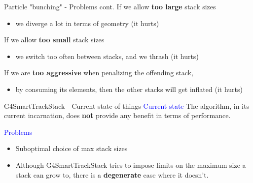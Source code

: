 \documentclass{beamer}
\begin{document}
\begin{frame}{Particle "bunching" - Problems cont.}
If we allow {\bf too large} stack sizes
\begin{itemize}
\item we diverge a lot in terms of geometry (it hurts)
\end{itemize}
If we allow {\bf too small} stack sizes
\begin{itemize}
\item we switch too often between stacks, and we thrash (it hurts)
\end{itemize}
\vspace{5mm}
If we are {\bf too aggressive} when penalizing the offending stack,
\begin{itemize}
\item by consuming its elements, then the other stacks will get inflated (it hurts)
\end{itemize}

\begin{center}
\end{center}
\end{frame}

\begin{frame}{G4SmartTrackStack - Current state of things}
\textcolor{blue}{Current state}
The algorithm, in its current incarnation, does {\bf not} provide any benefit in
terms of performance.

\vspace{5mm}

\textcolor{blue}{Problems}
\begin{itemize}
\item Suboptimal choice of max stack sizes
\item Although G4SmartTrackStack tries to impose limits on the maximum size a
stack can grow to, there is a {\bf degenerate} case where it doesn't.
\end{itemize}
\end{frame}
\end{document}
